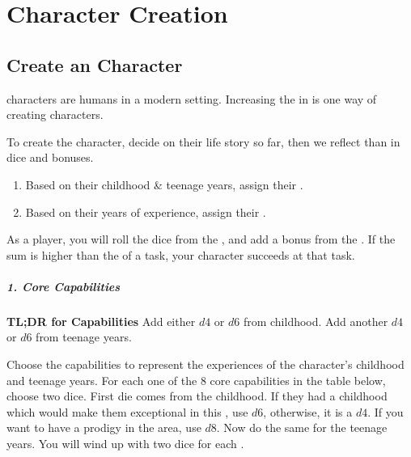 \chapterspaceabove{2.75cm}
\chapterspacebelow{5.25cm}


\chapter{Character Creation}

\section{Create an  Character}

\label{sec:character_creation}

\begin{marginNote}
	 characters are humans in a modern setting.
	Increasing the  in 
	is one way of creating  characters.
\end{marginNote}
To create the character, decide on their life story so far,
then we reflect than in dice and bonuses.
\begin{enumerate}
	\item Based on their childhood \& teenage years, assign their .
	\item Based on their years of experience, assign their .
\end{enumerate}

As a player, you will roll the dice from the ,
and add a bonus from the .
If the sum is higher than the  of a task,
your character succeeds at that task.

\paragraph*{1. Core Capabilities}

\begin{marginNote}
	\textbf{TL;DR for Capabilities}
	Add either $d4$ or $d6$ from childhood.
	Add another $d4$ or $d6$ from teenage years.
\end{marginNote}

Choose the capabilities to represent the experiences of the character's childhood and teenage years.
For each one of the 8 core capabilities in the table below, choose two dice.
First die comes from the childhood. If they had a childhood which would
make them exceptional in this , use $d6$, otherwise, it is a $d4$.
If you want to have a prodigy in the area, use $d8$.
Now do the same for the teenage years. You will wind up with
two dice for each .

